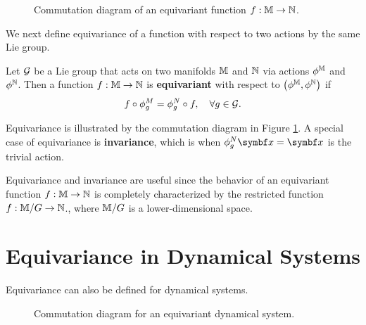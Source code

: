 \begin{figure}
  \begin{center}
  \end{center}
  \caption{Commutation diagram of an equivariant function $f : {\mathbb{M}} \rightarrow {\mathbb{N}}$.}
  \label{fig:equivariance_diagram}
\end{figure}

We next define equivariance of a function with respect to two actions by the same Lie group.
\begin{definition}
  Let $\mathcal{G}$ be a Lie group that acts on two manifolds ${\mathbb{M}}$ and ${\mathbb{N}}$ via actions $\phi^{\mathbb{M}}$ and $\phi^{\mathbb{N}}$. Then a function $f : {\mathbb{M}} \rightarrow {\mathbb{N}}$ is \textbf{equivariant} with respect to $\left(\phi^{\mathbb{M}}, \phi^{\mathbb{N}}\right)$ if
  \begin{equation}
    f \circ \phi^M_g = \phi^N_g \circ f, \quad \forall g \in \mathcal{G}.
  \end{equation}
\end{definition}
Equivariance is illustrated by the commutation diagram in Figure \ref{fig:equivariance_diagram}. A special case of equivariance is \textbf{invariance}, which is when $\phi^N_g \x = \x$ is the trivial action.

Equivariance and invariance are useful since the behavior of an equivariant function $f : {\mathbb{M}} \rightarrow {\mathbb{N}}$ is completely characterized by the restricted function $f : {\mathbb{M}} / G \rightarrow {\mathbb{N}}$., where ${\mathbb{M}} / G$ is a lower-dimensional space.


\section{Equivariance in Dynamical Systems}

Equivariance can also be defined for dynamical systems.

\begin{figure}
  \begin{center}
  \end{center}
  \caption{Commutation diagram for an equivariant dynamical system.}
  \label{fig:system_equivariance_diagram}
\end{figure}

